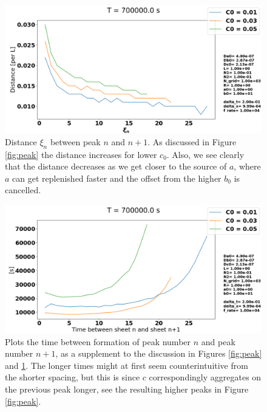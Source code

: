 \documentclass[1p]{elsarticle}        	%
\begin{document}
\begin{figure}
	\centering
	\includegraphics[width=\linewidth]{../figures/deltaC0_x.png}
	\caption{Distance $\xi_n$ between peak $n$ and $n+1$. As discussed in Figure \ref{fig:peak} the distance increases for lower $c_0$. Also, we see clearly that the distance decreases as we get closer to the source of $a$, where $a$ can get replenished faster and the offset from the higher $b_0$ is cancelled.}
	\label{fig:peakx}
\end{figure}

\begin{figure}
	\centering
	\includegraphics[width=\linewidth]{../figures/deltaC0_t.png}
	\caption{Plots the time between formation of peak number $n$ and peak number $n+1$, as a supplement to the discussion in Figures \ref{fig:peak} and \ref{fig:peakx}. The longer times might at first seem counterintuitive from the shorter spacing, but this is since $c$ correspondingly aggregates on the previous peak longer, see the resulting higher peaks in Figure \ref{fig:peak}.}
	\label{fig:coords}
\end{figure}
\end{document}
